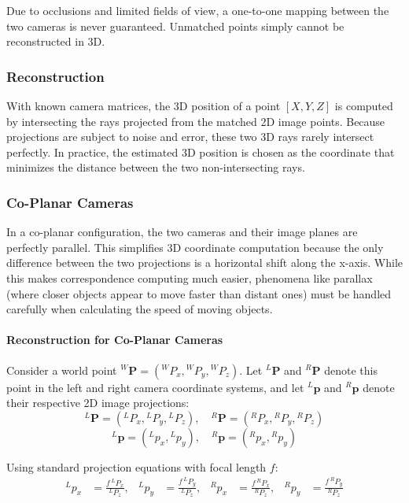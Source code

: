 Due to occlusions and limited fields of view, a one-to-one mapping between the two cameras is never guaranteed. 
Unmatched points simply cannot be reconstructed in 3D.

\subsubsection{Reconstruction}
With known camera matrices, the 3D position of a point $[X, Y, Z]$ is computed by 
intersecting the rays projected from the matched 2D image points. Because projections are subject to noise and error, 
these two 3D rays rarely intersect perfectly. In practice, the estimated 3D position 
is chosen as the coordinate that minimizes the distance between the two non-intersecting rays.

\subsubsection{Co-Planar Cameras}
In a co-planar configuration, the two cameras and their image planes are perfectly parallel. 
This simplifies 3D coordinate computation because the only difference between the two projections is a horizontal shift along the x-axis. 
While this makes correspondence computing much easier, phenomena like parallax (where closer objects appear to move faster than distant ones) 
must be handled carefully when calculating the speed of moving objects.

\paragraph{Reconstruction for Co-Planar Cameras}
\begin{figure}[H]
    \centering
    \resizebox{\linewidth}{!}{}
\end{figure}

Consider a world point ${}^{W}\boldsymbol{P}=({}^{W}P_x, {}^{W}P_y, {}^{W}P_z)$.
Let ${}^{L}\boldsymbol{P}$ and ${}^{R}\boldsymbol{P}$ denote this point in the left and right camera coordinate systems, and let ${}^{L}\boldsymbol{p}$ and ${}^{R}\boldsymbol{p}$ denote their respective 2D image projections:
\[
{}^{L}\boldsymbol{P}=({}^{L}P_x, {}^{L}P_y, {}^{L}P_z), \quad
{}^{R}\boldsymbol{P}=({}^{R}P_x, {}^{R}P_y, {}^{R}P_z)
\]
\[
{}^{L}\boldsymbol{p}=({}^{L}p_x, {}^{L}p_y), \quad
{}^{R}\boldsymbol{p}=({}^{R}p_x, {}^{R}p_y)
\]

Using standard projection equations with focal length $f$:
\begin{equation}
    \begin{aligned}
        {}^{L}p_x &= \frac{f\,{}^{L}P_x}{{}^{L}P_z}, &
        {}^{L}p_y &= \frac{f\,{}^{L}P_y}{{}^{L}P_z}, &
        {}^{R}p_x &= \frac{f\,{}^{R}P_x}{{}^{R}P_z}, &
        {}^{R}p_y &= \frac{f\,{}^{R}P_y}{{}^{R}P_z}
    \end{aligned}
    \label{eq:coplanar_projection_equations}
\end{equation}

